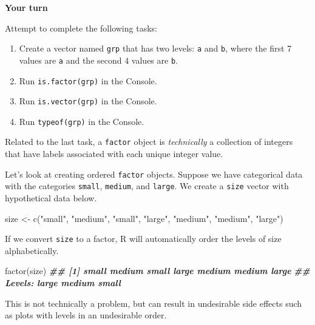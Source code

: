 \documentclass[
]{book}
\newenvironment{Shaded}{\begin{snugshade}}{\end{snugshade}}
\newcommand{\DocumentationTok}[1]{\textcolor[rgb]{0.56,0.35,0.01}{\textbf{\textit{#1}}}}
\newcommand{\FunctionTok}[1]{\textcolor[rgb]{0.00,0.00,0.00}{#1}}
\newcommand{\NormalTok}[1]{#1}
\newcommand{\OtherTok}[1]{\textcolor[rgb]{0.56,0.35,0.01}{#1}}
\newcommand{\StringTok}[1]{\textcolor[rgb]{0.31,0.60,0.02}{#1}}
\providecommand{\tightlist}{%
  \setlength{\itemsep}{0pt}\setlength{\parskip}{0pt}}
\theoremstyle{definition}
\theoremstyle{definition}
\theoremstyle{definition}
\theoremstyle{definition}
\theoremstyle{remark}
\begin{document}
\begin{yourturn}

\textbf{Your turn}

Attempt to complete the following tasks:

\begin{enumerate}
\def\labelenumi{\arabic{enumi}.}
\tightlist
\item
  Create a vector named \texttt{grp} that has two levels: \texttt{a} and \texttt{b}, where the first 7 values are \texttt{a} and the second 4 values are \texttt{b}.
\item
  Run \texttt{is.factor(grp)} in the Console.
\item
  Run \texttt{is.vector(grp)} in the Console.
\item
  Run \texttt{typeof(grp)} in the Console.
\end{enumerate}

Related to the last task, a \texttt{factor} object is \emph{technically} a collection of integers that have labels associated with each unique integer value.

Let's look at creating ordered \texttt{factor} objects. Suppose we have categorical data with the categories \texttt{small}, \texttt{medium}, and \texttt{large}. We create a \texttt{size} vector with hypothetical data below.

\begin{Shaded}
\begin{Highlighting}[]
\NormalTok{size }\OtherTok{\textless{}{-}} \FunctionTok{c}\NormalTok{(}\StringTok{"small"}\NormalTok{, }\StringTok{"medium"}\NormalTok{, }\StringTok{"small"}\NormalTok{, }\StringTok{"large"}\NormalTok{, }\StringTok{"medium"}\NormalTok{, }\StringTok{"medium"}\NormalTok{, }\StringTok{"large"}\NormalTok{)}
\end{Highlighting}
\end{Shaded}

If we convert \texttt{size} to a factor, R will automatically order the levels of size alphabetically.

\begin{Shaded}
\begin{Highlighting}[]
\FunctionTok{factor}\NormalTok{(size)}
\DocumentationTok{\#\# [1] small  medium small  large  medium medium large }
\DocumentationTok{\#\# Levels: large medium small}
\end{Highlighting}
\end{Shaded}

This is not technically a problem, but can result in undesirable side effects such as plots with levels in an undesirable order.


\end{yourturn}
\end{document}
